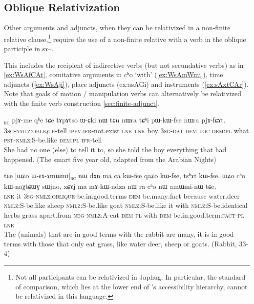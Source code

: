\documentclass[oldfontcommands,oneside,a4paper,11pt]{article}
\newcommand{\ipa}[1]{{\phon #1}} %
\newcommand{\topic}{\textsc{dem}}
\newcommand{\rc}{\textsubscript{\textsc{rc}}}
\begin{document}
\subsection{Oblique Relativization}
Other arguments and adjuncts, when they can be relativized in a non-finite relative clause,\footnote{Not all participants can be relativized in Japhug. In particular, the standard of comparison, which lies at the lower end of \citet{keenan77accessibility}'s accessibility hierarchy, cannot be relativized in this language.} require the use of a non-finite relative with a verb in the oblique participle in \ipa{sɤ--}.

This includes the recipient of indirective verbs (but not secundative verbs) as in \ref{ex:WsAfCAt}, comitative arguments in \ipa{cʰo} `with' (\ref{ex:WsAmWmi}), time adjuncts (\ref{ex:WsAji}), place adjuncts ({ex:asAGi}) and instruments (\ref{ex:sAxtCAr}). Note that goals of motion / manipulation verbs can alternatively be relativized with the finite verb construction \ref{sec:finite-adjunct}.

\begin{exe}
\ex \label{ex:WsAfCAt}
\gll
[\ipa{ɯ-sɤ-fɕɤt}]\rc{} 
\ipa{pjɤ-me} 	\ipa{qʰe} 	\ipa{tɕe} 	\ipa{tɤpɤtso} 	\ipa{ɯ-ɕki} 	\ipa{nɯ} 	\ipa{tɕu} 	\ipa{nɯra} 	\ipa{tɕʰi} 	\ipa{pɯ-kɯ-fse} 	\ipa{nɯra} 	\ipa{pjɤ-fɕɤt.} \\
\textsc{3sg-nmlz:oblique}-tell \textsc{ipfv.ifr}-not.exist \textsc{lnk} \textsc{lnk} boy \textsc{3sg-dat} \textsc{dem} \textsc{loc} \textsc{dem:pl} what \textsc{pst-nmlz:S}-be.like  \textsc{dem:pl} \textsc{ifr}-tell \\
\glt She had no one (else) to tell it to, so she told the boy everything that had happened. (The smart five year old, adapted from the Arabian Nights)
\end{exe} 

\begin{exe}
   \ex \label{ex:WsAmWmi}
 \gll 
\ipa{tɕe}   	[\ipa{ɯʑo}   	\ipa{ɯ-sɤ-ɤmɯmi}]\rc{}   	\ipa{nɯ}   	\ipa{dɤn}   	\ipa{ma}   	\ipa{ca}   	\ipa{kɯ-fse}   	\ipa{qaʑo}   	\ipa{kɯ-fse,}   	\ipa{tsʰɤt}   	\ipa{kɯ-fse,}   	 \ipa{ɯʑo}   	\ipa{cʰo}   	\ipa{kɯ-naχtɕɯɣ}   	\ipa{sɯjno,}   	\ipa{xɕɤj}   	\ipa{ma}   	\ipa{mɤ-kɯ-ndza}   	\ipa{nɯ} \ipa{ra}   	\ipa{cʰo}   	\ipa{nɯ}   	\ipa{amɯmi-nɯ}   	\ipa{tɕe,}   \\
\textsc{lnk} it \textsc{3sg-nmlz:oblique}-be.in.good.terms \topic{} be.many:{fact} because water.deer \textsc{nmlz:S}-be.like sheep \textsc{nmlz:S}-be.like goat  \textsc{nmlz:S}-be.like it with  \textsc{nmlz:S}-be.identical herbs grass apart.from \textsc{neg-nmlz:A}-eat \textsc{dem} \textsc{pl} with \textsc{dem} be.in.good.term:\textsc{fact}-\textsc{pl} \textsc{lnk} \\
\glt The (animals) that are in good terms with the rabbit are many, it is in good terms with those that only eat grass, like water deer, sheep or goats. (Rabbit, 33-4)
\end{exe}
\end{document}
